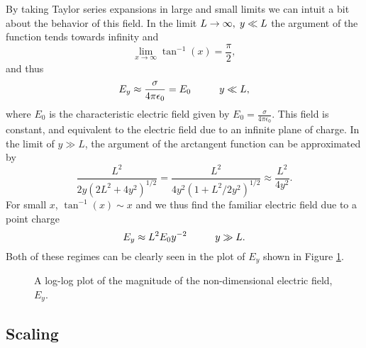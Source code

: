 \documentclass[a4paper, 12pt]{article}
\begin{document}
By taking Taylor series expansions in large and small limits we can intuit a bit about the behavior of this field. In the limit $L \rightarrow \infty, \hspace{1mm} y \ll L$ the argument of the function tends towards infinity and
\[ \lim_{x\to\infty} \tan^{-1}(x) = \frac{\pi}{2}
,\]
and thus
\begin{equation}
E_y \approx \frac{\sigma}{4 \pi \epsilon_0} = E_0 \hspace{10mm} y \ll L
,\end{equation}
where $E_0$ is the characteristic electric field given by $E_0 = \frac{\sigma}{4 \pi \epsilon_0}$. This field is constant, and equivalent to the electric field due to an infinite plane of charge. In the limit of $y \gg L$, the argument of the arctangent function can be approximated by
\[ \frac{L^2}{2 y \left( 2 L^2 + 4 y^2\right)^{1/2}} = \frac{L^2}{4 y^2 \left( 1 + L^2/2y^2 \right)^{1/2}} \approx \frac{L^2}{4 y^2}
.\]
For small $x$, $\tan^{-1}(x) \sim x$ and we thus find the familiar electric field due to a point charge
\begin{equation}
E_y \approx L^2 E_0 y^{-2}  \hspace{10mm} y \gg L
.\end{equation}
Both of these regimes can be clearly seen in the plot of $E_y$ shown in Figure \ref{fig:E0}.
\begin{figure}[htb]
    \centering
    
    \caption{A log-log plot of the magnitude of the non-dimensional electric field, $E_y$.\label{fig:E0}}
\end{figure}

\subsection{Scaling}
\end{document}
